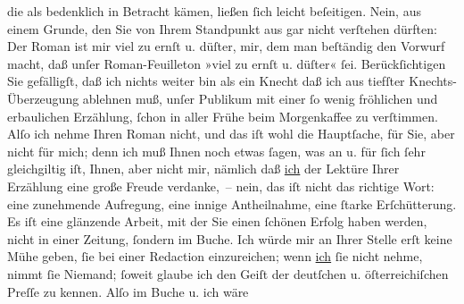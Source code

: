 \begin{ledgroupsized}[t]{13cm}
                    die als bedenklich in Betracht kämen, ließen ſich leicht beſeitigen. Nein, aus
                    einem Grunde, den Sie von Ihrem Standpunkt aus gar nicht verſtehen dürften: Der
                        Roman ist mir viel zu ernſt u. düſter,
                    mir, dem man beſtändig den Vorwurf macht, daß unſer Roman-Feuilleton »viel zu
                    ernſt u. düſter« ſei. Berückſichtigen Sie gefälligſt, daß ich nichts weiter bin
                    als ein Knecht \label{T_L00186_1v}\label{T_L00186_1h} daß ich aus tiefſter
                    Knechts-Überzeugung ablehnen muß, unſer Publikum mit einer ſo wenig fröhlichen
                    und erbaulichen Erzählung, ſchon in aller Frühe beim Morgenkaffee zu
                    verſtimmen.\pend
           \pstart
           Alſo ich nehme Ihren Roman nicht, und das iſt
                    wohl die Hauptſache, für Sie, aber nicht für mich; denn ich muß Ihnen noch etwas
                    ſagen, was an u. für ſich ſehr gleichgiltig iſt, Ihnen, aber nicht mir, nämlich
                    daß {\pb}\uline{ich} der Lektüre Ihrer Erzählung eine große Freude verdanke, – nein, das iſt
                         nicht das richtige Wort: eine zunehmende Aufregung, eine innige
                    Antheilnahme, eine ſtarke Erſchütterung. Es iſt eine glänzende Arbeit, mit der
                    Sie einen ſchönen Erfolg haben werden, nicht in einer Zeitung, ſondern im Buche.
                    Ich würde mir an Ihrer Stelle erſt keine Mühe geben, ſie bei einer Redaction
                    einzureichen; wenn \uline{ich}{ }ſie nicht nehme, nimmt
                    ſie Niemand; ſoweit glaube ich den Geiſt der deutſchen u. öſterreichiſchen Preſſe zu kennen. Alſo im Buche u. ich wäre

\end{ledgroupsized}

